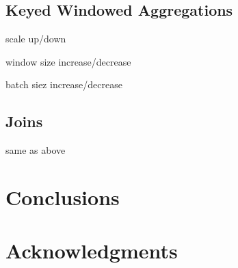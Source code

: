 \documentclass{vldb}
\begin{document}
\subsection{Keyed Windowed Aggregations}
scale up/down

window size increase/decrease

batch siez increase/decrease

\subsection{Joins}
same as above
\section{Conclusions}

\balance

\section{Acknowledgments}





\end{document}

